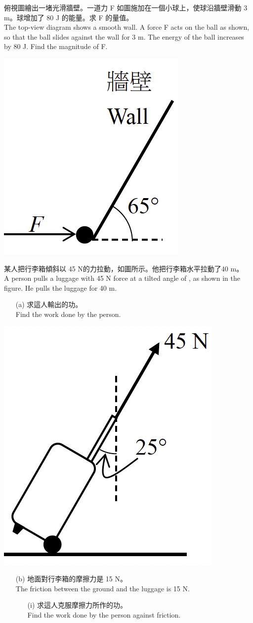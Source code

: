 \documentclass[beamer=true]{standalone}
\begin{document}
\begin{eg}
    俯視圖繪出一堵光滑牆壁。一道力 F 如圖施加在一個小球上，使球沿牆壁滑動 3 m。球增加了 80 J 的能量。求 F 的量值。 \\The top-view diagram shows a smooth wall. A force F acts on the ball as shown, so that the ball slides against the wall for 3 m. The energy of the ball increases by 80 J. Find the magnitude of F.
        {\par\raggedleft
            \includegraphics[width=.25\textwidth]{assets/f9626666.png}
            \par}
\end{eg}

\begin{eg}
    某人把行李箱傾斜以 45 N的力拉動，如圖所示。他把行李箱水平拉動了40 m。 \\A person pulls a luggage with 45 N force at a tilted angle of , as shown in the figure. He pulls the luggage for 40 m.
    \begin{itemize}
        \item[(a)] 求這人輸出的功。 \\Find the work done by the person.
    \end{itemize}
    \hfill{
        \includegraphics[width=.25\textwidth]{assets/1169635b.png}
        \par}
\end{eg}

\begin{eg}
    \begin{itemize}
        \item [(b)] 地面對行李箱的摩擦力是 15 N。 \\The friction between the ground and the luggage is 15 N.
              \begin{itemize}
                  \item [(i)]求這人克服摩擦力所作的功。\\ Find the work done by the person against friction.
              \end{itemize}
    \end{itemize}
\end{eg}
\end{document}
